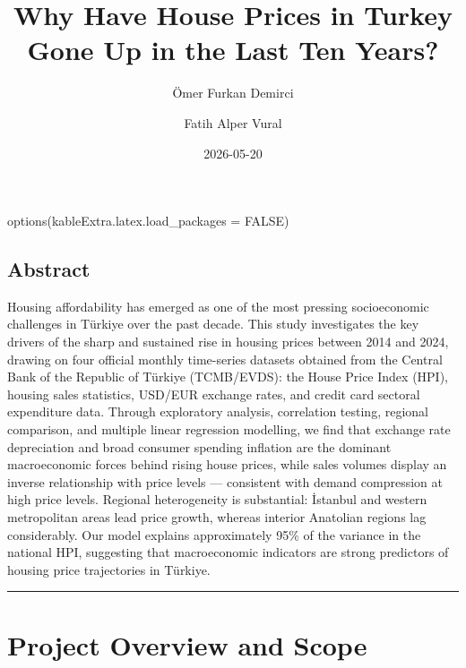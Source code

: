 \documentclass[
  11pt,
  a4paper,
]{article}
\title{Why Have House Prices in Turkey Gone Up in the Last Ten Years?}
\author{Ömer Furkan Demirci \and Fatih Alper Vural}
\date{2026-05-20}
\newenvironment{Shaded}{\begin{snugshade}}{\end{snugshade}}
\newcommand{\AttributeTok}[1]{\textcolor[rgb]{0.40,0.45,0.13}{#1}}
\newcommand{\ConstantTok}[1]{\textcolor[rgb]{0.56,0.35,0.01}{#1}}
\newcommand{\FunctionTok}[1]{\textcolor[rgb]{0.28,0.35,0.67}{#1}}
\newcommand{\NormalTok}[1]{\textcolor[rgb]{0.00,0.23,0.31}{#1}}
\renewcommand*\contentsname{Table of contents}
\newcommand\contentsname{Table of contents}
\begin{document}
\maketitle

\renewcommand*\contentsname{Table of contents}
{
\hypersetup{linkcolor=}
\setcounter{tocdepth}{3}
\tableofcontents
}

\begin{Shaded}
\begin{Highlighting}[]
\FunctionTok{options}\NormalTok{(}\AttributeTok{kableExtra.latex.load\_packages =} \ConstantTok{FALSE}\NormalTok{)}
\end{Highlighting}
\end{Shaded}

\subsection*{Abstract}\label{abstract}

Housing affordability has emerged as one of the most pressing
socioeconomic challenges in Türkiye over the past decade. This study
investigates the key drivers of the sharp and sustained rise in housing
prices between 2014 and 2024, drawing on four official monthly
time-series datasets obtained from the Central Bank of the Republic of
Türkiye (TCMB/EVDS): the House Price Index (HPI), housing sales
statistics, USD/EUR exchange rates, and credit card sectoral expenditure
data. Through exploratory analysis, correlation testing, regional
comparison, and multiple linear regression modelling, we find that
exchange rate depreciation and broad consumer spending inflation are the
dominant macroeconomic forces behind rising house prices, while sales
volumes display an inverse relationship with price levels --- consistent
with demand compression at high price levels. Regional heterogeneity is
substantial: İstanbul and western metropolitan areas lead price growth,
whereas interior Anatolian regions lag considerably. Our model explains
approximately 95\% of the variance in the national HPI, suggesting that
macroeconomic indicators are strong predictors of housing price
trajectories in Türkiye.

\begin{center}\rule{0.5\linewidth}{0.5pt}\end{center}

\section{Project Overview and Scope}\label{project-overview-and-scope}
\end{document}
